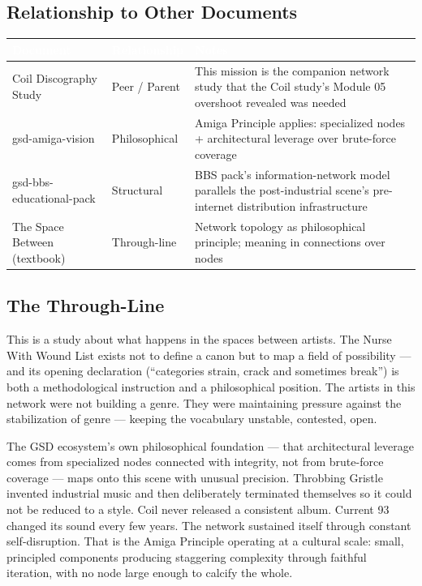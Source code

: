 \documentclass[11pt,letterpaper]{article}
\newcommand{\tableheader}[1]{\textbf{\sffamily\textcolor{white}{#1}}}
\begin{document}
\subsection{Relationship to Other Documents}

\begin{center}
\begin{tabularx}{\textwidth}{L{4cm}L{3cm}X}
\toprule
{}
\tableheader{Document} & \tableheader{Relationship} & \tableheader{Notes} \\
\midrule
Coil Discography Study & Peer / Parent & This mission is the companion network study that the Coil study's Module 05 overshoot revealed was needed \\
gsd-amiga-vision & Philosophical & Amiga Principle applies: specialized nodes + architectural leverage over brute-force coverage \\
gsd-bbs-educational-pack & Structural & BBS pack's information-network model parallels the post-industrial scene's pre-internet distribution infrastructure \\
The Space Between (textbook) & Through-line & Network topology as philosophical principle; meaning in connections over nodes \\
\bottomrule
\end{tabularx}
\end{center}

\subsection{The Through-Line}

This is a study about what happens in the spaces between artists. The Nurse With Wound List
exists not to define a canon but to map a field of possibility — and its opening declaration
(``categories strain, crack and sometimes break'') is both a methodological instruction and a
philosophical position. The artists in this network were not building a genre. They were
maintaining pressure against the stabilization of genre — keeping the vocabulary unstable,
contested, open.

The GSD ecosystem's own philosophical foundation — that architectural leverage comes from
specialized nodes connected with integrity, not from brute-force coverage — maps onto this scene
with unusual precision. Throbbing Gristle invented industrial music and then deliberately
terminated themselves so it could not be reduced to a style. Coil never released a consistent
album. Current 93 changed its sound every few years. The network sustained itself through
constant self-disruption. That is the Amiga Principle operating at a cultural scale: small,
principled components producing staggering complexity through faithful iteration, with no node
large enough to calcify the whole.
\end{document}
